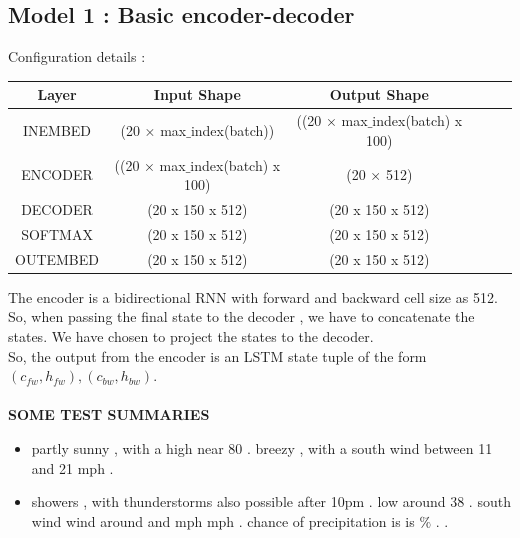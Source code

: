\documentclass[12pt]{report}
\begin{document}
\subsection{Model 1 : Basic encoder-decoder}
Configuration details :
\begin{table}[H]
	\label{T:equipos}
	\begin{center}
		\begin{tabular}{| c | c | c | c | c | c |}
			\hline
			\textbf{Layer} & \textbf{Input Shape} & \textbf{Output Shape}\\ 
			\hline
			INEMBED & (20 × max$\_$index(batch))& ((20 × max$\_$index(batch) x 100) \\
            ENCODER & ((20 × max$\_$index(batch) x 100) & (20 × 512) \\
            DECODER & (20 x 150 x 512) & (20 x 150 x 512) \\
            SOFTMAX  & (20 x 150 x 512) & (20 x 150 x 512) \\
            OUTEMBED  & (20 x 150 x 512) & (20 x 150 x 512) \\
            \hline
		\end{tabular}
	\end{center}
\end{table}
The encoder is a bidirectional RNN with forward and backward cell size as 512. So, when passing the final state to the decoder , we have to concatenate the states. We have chosen to project the states to the decoder.\\So, the output from the encoder is an LSTM state tuple of the form $(c_{fw},h_{fw}),(c_{bw},h_{bw})$.\\\\

\textbf{SOME TEST SUMMARIES}
\begin{itemize}
\item partly sunny , with a high near 80 . breezy , with a south wind between 11 and 21 mph .
\item showers , with thunderstorms also possible after 10pm . low around 38 . south wind wind around and mph mph . chance of precipitation is is $\%$ . .
\end{itemize}
\end{document}
